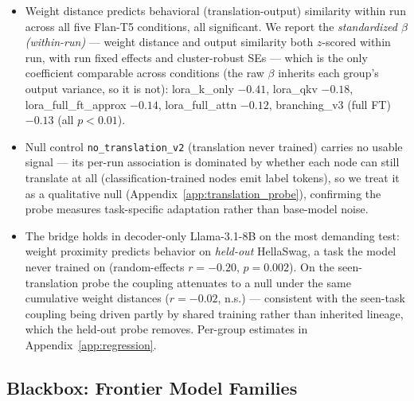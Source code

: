 \documentclass{article}
\begin{document}
\begin{itemize}
  \item Weight distance predicts behavioral (translation-output) similarity within run across all
    five Flan-T5 conditions, all significant. We report the \emph{standardized $\beta$ (within-run)}
    --- weight distance and output similarity both $z$-scored within run, with run fixed effects and
    cluster-robust SEs --- which is the only coefficient comparable across conditions (the raw
    $\beta$ inherits each group's output variance, so it is not):
    lora\_k\_only $-0.41$, lora\_qkv $-0.18$, lora\_full\_ft\_approx $-0.14$, lora\_full\_attn
    $-0.12$, branching\_v3 (full FT) $-0.13$ (all $p<0.01$).
  \item Null control \texttt{no\_translation\_v2} (translation never trained) carries no usable
    signal --- its per-run association is dominated by whether each node can still translate at all
    (classification-trained nodes emit label tokens), so we treat it as a qualitative null
    (Appendix~\ref{app:translation_probe}), confirming the probe measures task-specific adaptation
    rather than base-model noise.
  \item The bridge holds in decoder-only Llama-3.1-8B on the most demanding test: weight proximity
    predicts behavior on \emph{held-out} HellaSwag, a task the model never trained on (random-effects
    $r=-0.20$, $p=0.002$). On the seen-translation probe the coupling attenuates to a null under the
    same cumulative weight distances ($r=-0.02$, n.s.) --- consistent with the seen-task coupling
    being driven partly by shared training rather than inherited lineage, which the held-out probe
    removes. Per-group estimates in Appendix~\ref{app:regression}.
\end{itemize}


\subsection{Blackbox: Frontier Model Families}
\label{sec:results:blackbox}
\end{document}
